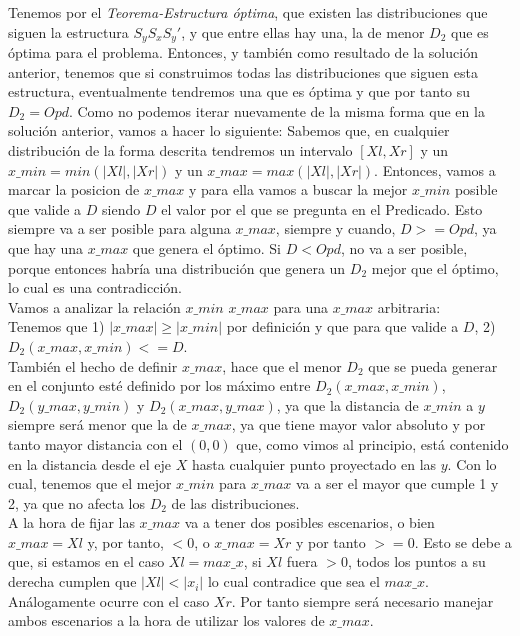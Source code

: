 \documentclass{article}
\begin{document}
Tenemos por el \textit{Teorema-Estructura \'optima}, que existen las distribuciones que siguen la estructura $S_yS_xS_y'$, y que entre ellas hay una, la de menor $D_2$ que es \'optima para el problema. Entonces, y tambi\'en como resultado de la soluci\'on anterior, tenemos que si construimos todas las distribuciones que siguen esta estructura, eventualmente tendremos una que es \'optima y que por tanto su  $D_2=Opd$. Como no podemos iterar nuevamente de la misma forma que en la soluci\'on anterior, vamos a hacer lo siguiente: Sabemos que, en cualquier distribuci\'on de la forma descrita tendremos un intervalo $[Xl,Xr]$ y un $x\_min=min(|Xl|,|Xr|)$ y un  $x\_max=max(|Xl|,|Xr|)$. Entonces, vamos a marcar la posicion de $x\_max$ y para ella vamos a buscar la mejor $x\_min$ posible que valide a $D$ siendo $D$ el valor por el que se pregunta en el Predicado. Esto siempre va a ser posible para alguna $x\_max$, siempre y cuando, $D>=Opd$, ya que hay una $x\_max$ que genera el \'optimo. Si $D<Opd$, no va a ser posible, porque entonces habr\'ia una distribuci\'on que genera un $D_2$  mejor que el \'optimo, lo cual es una contradicci\'on.\\
Vamos a analizar la relaci\'on $x\_min$ $x\_max$ para una $x\_max$ arbitraria:\\
Tenemos que 1) $|x\_max|\geq|x\_min|$ por definici\'on y que para que valide a $D$, 2)$D_2(x\_max,x\_min)<=D$. \\ 
Tambi\'en el hecho de definir $x\_max$, hace que el menor $D_2$ que se pueda generar en el conjunto est\'e definido por los m\'aximo entre $D_2(x\_max,x\_min)$, $D_2(y\_max,y\_min)$ y $D_2(x\_max,y\_max)$, ya que la distancia de $x\_min$ a $y$ siempre ser\'a menor que la de $x\_max$, ya que tiene mayor valor absoluto y por tanto mayor distancia con el $(0,0)$ que, como vimos al principio, est\'a contenido en la distancia desde el eje $X$ hasta cualquier punto proyectado en las $y$. Con lo cual, tenemos que el mejor $x\_min$ para $x\_max$ va a ser el mayor que cumple 1 y 2, ya que no afecta los $D_2$ de las distribuciones.\\
A la hora de fijar las $x\_max$ va a tener dos posibles escenarios, o bien $x\_max=Xl$ y, por tanto, $<0$, o  $x\_max=Xr$ y por tanto $>=0$. Esto se debe a que, si estamos en el caso $Xl = max\_x$, si $Xl$ fuera $>0$, todos los puntos a su derecha cumplen que $|Xl|<|x_i|$ lo cual contradice que sea el $max\_x$. An\'alogamente ocurre con el caso $Xr$. Por tanto siempre ser\'a necesario manejar ambos escenarios a la hora de utilizar los valores de $x\_max$.\\
\end{document}
